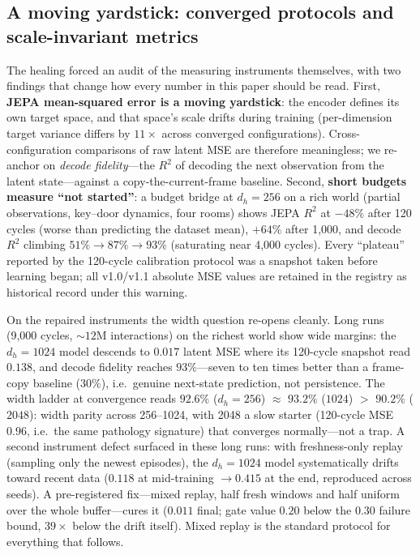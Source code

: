 \documentclass[11pt,a4paper]{article}
\begin{document}
\subsection{A moving yardstick: converged protocols and scale-invariant metrics}\label{sec:yardstick}

The healing forced an audit of the measuring instruments themselves, with two findings that change how every number in this paper should be read. First, \textbf{JEPA mean-squared error is a moving yardstick}: the encoder defines its own target space, and that space's scale drifts during training (per-dimension target variance differs by $11\times$ across converged configurations). Cross-configuration comparisons of raw latent MSE are therefore meaningless; we re-anchor on \emph{decode fidelity}---the $R^2$ of decoding the next observation from the latent state---against a copy-the-current-frame baseline. Second, \textbf{short budgets measure ``not started''}: a budget bridge at $d_h{=}256$ on a rich world (partial observations, key--door dynamics, four rooms) shows JEPA $R^2$ at $-48\%$ after 120 cycles (worse than predicting the dataset mean), $+64\%$ after 1{,}000, and decode $R^2$ climbing $51\% \rightarrow 87\% \rightarrow 93\%$ (saturating near 4{,}000 cycles). Every ``plateau'' reported by the 120-cycle calibration protocol was a snapshot taken before learning began; all v1.0/v1.1 absolute MSE values are retained in the registry as historical record under this warning.

On the repaired instruments the width question re-opens cleanly. Long runs (9{,}000 cycles, ${\sim}12$M interactions) on the richest world show wide margins: the $d_h{=}1024$ model descends to $0.017$ latent MSE where its 120-cycle snapshot read $0.138$, and decode fidelity reaches $93\%$---seven to ten times better than a frame-copy baseline ($30\%$), i.e.\ genuine next-state prediction, not persistence. The width ladder at convergence reads $92.6\%$ ($d_h{=}256$) $\approx$ $93.2\%$ ($1024$) $>$ $90.2\%$ ($2048$): width parity across 256--1024, with 2048 a slow starter (120-cycle MSE $0.96$, i.e.\ the same pathology signature) that converges normally---not a trap. A second instrument defect surfaced in these long runs: with freshness-only replay (sampling only the newest episodes), the $d_h{=}1024$ model systematically drifts toward recent data ($0.118$ at mid-training $\rightarrow 0.415$ at the end, reproduced across seeds). A pre-registered fix---mixed replay, half fresh windows and half uniform over the whole buffer---cures it ($0.011$ final; gate value $0.20$ below the $0.30$ failure bound, $39\times$ below the drift itself). Mixed replay is the standard protocol for everything that follows.
\end{document}
